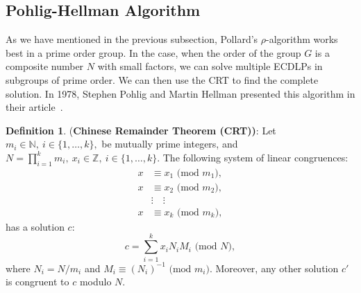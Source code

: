 \documentclass[thesis=M,english]{FITthesis}[2012/10/20]
\theoremstyle{remark}
\theoremstyle{definition}
\newtheorem{DF}{Definition}[section]
\begin{document}
\subsection{Pohlig-Hellman Algorithm}
As we have mentioned in the previous subsection, Pollard's $\rho$-algorithm works best in a prime order group. In the case, when the order of the group $G$ is a composite number $N$ with small factors, we can solve multiple ECDLPs in subgroups of prime order. We can then use the CRT to find the complete solution. In 1978, Stephen Pohlig and Martin Hellman presented this algorithm in their article~\cite{PH}. 
\begin{DF} (\textbf{Chinese Remainder Theorem (CRT))}: Let $m_i \in \mathbb{N},\ i \in \{1,\ldots, k\},$ be mutually prime integers, and $N=\prod_{i=1}^k m_i,\ x_i \in \mathbb{Z},\ i \in \{1,\ldots, k\}.$ 
The following system of linear congruences:
\begin{align*}
x &\equiv x_1 \text{ (mod $m_1$)}, \\
x &\equiv x_2 \text{ (mod $m_2$)}, \\
&\vdots \quad \vdots \\
x &\equiv x_k \text{ (mod $m_k$)},
\end{align*}
has a solution $c$:
$$
c = \sum_{i=1}^k x_iN_iM_i \text{ (mod $N$)},
$$ where $N_i=N/m_i$ and $M_i\equiv(N_i)^{-1} \text{ (mod $m_i$)}$. Moreover, any other solution $c'$ is congruent to $c$ modulo $N$.
\end{DF}
\end{document}
